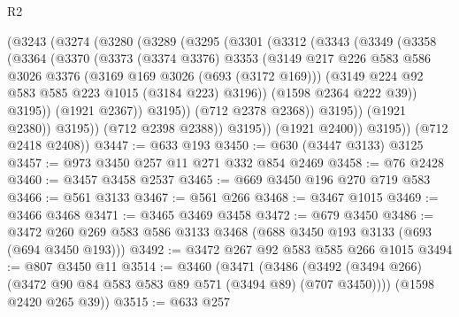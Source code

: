 \begin{lexlean}{R2}
\begin{coremodule}
                (@3243
                  (@3274
                    (@3280
                      (@3289
                        (@3295
                          (@3301
                            (@3312
                              (@3343
                                (@3349
                                  (@3358
                                    (@3364
                                      (@3370
                                        (@3373
                                          (@3374 @3376)
                                          @3353
                                          (@3149
                                            @217
                                            @226
                                            @583
                                            @586
                                            @3026
                                            @3376
                                            (@3169 @169 @3026 (@693 (@3172 @169)))
                                            (@3149
                                              @224
                                              @92
                                              @583
                                              @585
                                              @223
                                              @1015
                                              (@3184 @223)
                                              @3196))
                                          (@1598 @2364 @222 @39))
                                        @3195))
                                    (@1921 @2367))
                                  @3195))
                              (@712 @2378 @2368))
                            @3195))
                        (@1921 @2380))
                      @3195))
                  (@712 @2398 @2388))
                @3195))
            (@1921 @2400))
          @3195))
      (@712 @2418 @2408))
@3447 := @633 @193
@3450 := @630 (@3447 @3133) @3125
@3457 := @973 @3450 @257 @11 @271 @332 @854 @2469
@3458 := @76 @2428
@3460 := @3457 @3458 @2537
@3465 := @669 @3450 @196 @270 @719 @583
@3466 := @561 @3133
@3467 := @561 @266
@3468 := @3467 @1015
@3469 := @3466 @3468
@3471 := @3465 @3469 @3458
@3472 := @679 @3450
@3486 := @3472 @260 @269 @583 @586 @3133 @3468 (@688 @3450 @193 @3133 (@693 (@694 @3450 @193)))
@3492 := @3472 @267 @92 @583 @585 @266 @1015
@3494 := @807 @3450 @11
@3514 := @3460
    (@3471
      (@3486 (@3492 (@3494 @266) (@3472 @90 @84 @583 @583 @89 @571 (@3494 @89) (@707 @3450))))
      (@1598 @2420 @265 @39))
@3515 := @633 @257

\end{coremodule}
\end{lexlean}
